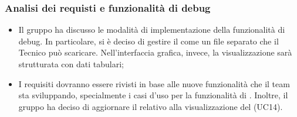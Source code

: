 \subsubsection{Analisi dei requisti e funzionalità di debug}
\begin{itemize}
	\item Il gruppo ha discusso le modalità di implementazione della funzionalità di debug. In particolare, si è deciso di gestire il  come un file separato che il Tecnico può scaricare. Nell'interfaccia grafica, invece, la visualizzazione sarà strutturata con dati tabulari;
	\item I requisiti dovranno essere rivisti in base alle nuove funzionalità che il team sta sviluppando, specialmente i casi d'uso per la funzionalità di . Inoltre, il gruppo ha deciso di aggiornare il  relativo alla visualizzazione del (UC14).
\end{itemize}
